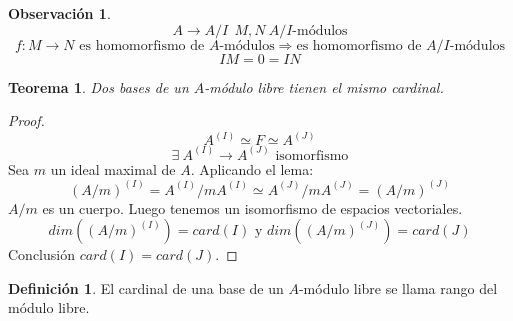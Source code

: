 \documentclass{article}
\theoremstyle{theorem-style}  %
\newtheorem{theorem}{Teorema}[section]  %
\theoremstyle{definition}
\newtheorem{definition}{Definición}[section]
\newtheorem*{observation}{Observación} %
\theoremstyle{example-style}
\begin{document}
	\begin{observation}
		\[A\rightarrow A/I \ \  M,N \  A/I\text{-módulos}\]
		\[f:M\rightarrow N \text{ es homomorfismo de $A$-módulos} \Rightarrow \text{es homomorfismo de $A/I$-módulos}\]
		\[IM=0=IN\]
	\end{observation}

	\begin{theorem}
		Dos bases de un $A$-módulo libre tienen el mismo cardinal.
	\end{theorem}

	\begin{proof}
		\[A^{(I)} \simeq F \simeq A^{(J)}\]
		\[\exists \  A^{(I)} \rightarrow A^{(J)} \text{ isomorfismo}\]
		Sea $m$ un ideal maximal de $A$. Aplicando el lema:
		\[ (A/m)^{(I)} = A^{(I)}/mA^{(I)} \simeq A^{(J)}/mA^{(J)} = (A/m)^{(J)} \]
		$A/m$ es un cuerpo. Luego tenemos un isomorfismo de espacios vectoriales.
		\[dim((A/m)^{(I)})=card(I) \text{ y } dim((A/m)^{(J)})=card(J)\]
		Conclusión $card(I)=card(J)$.
	\end{proof}

	\begin{definition}
		El cardinal de una base de un $A$-módulo libre se llama rango del módulo libre.
	\end{definition}
	\printindex
\end{document}
